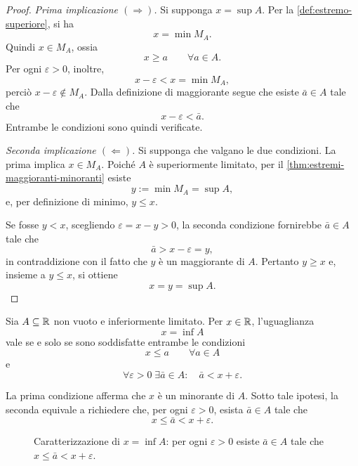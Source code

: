 \begin{proof}
\emph{Prima implicazione \((\Rightarrow)\).}
Si supponga \(x=\sup A\). Per la
\cref{def:estremo-superiore}, si ha
\[
  x=\min M_A.
\]
Quindi \(x\in M_A\), ossia
\[
  x\ge a\qquad\forall a\in A.
\]
Per ogni \(\varepsilon>0\), inoltre,
\[
  x-\varepsilon<x=\min M_A,
\]
perciò \(x-\varepsilon\notin M_A\). Dalla definizione di maggiorante
segue che esiste \(\bar a\in A\) tale che
\[
  x-\varepsilon<\bar a.
\]
Entrambe le condizioni sono quindi verificate.

\emph{Seconda implicazione \((\Leftarrow)\).}
Si supponga che valgano le due condizioni. La prima implica
\(x\in M_A\). Poiché \(A\) è superiormente limitato,
per il \cref{thm:estremi-maggioranti-minoranti} esiste
\[
  y:=\min M_A=\sup A,
\]
e, per definizione di minimo, \(y\le x\).

Se fosse \(y<x\), scegliendo \(\varepsilon=x-y>0\),
la seconda condizione fornirebbe \(\bar a\in A\) tale che
\[
  \bar a>x-\varepsilon=y,
\]
in contraddizione con il fatto che \(y\) è un maggiorante di
\(A\). Pertanto \(y\ge x\) e, insieme a \(y\le x\), si ottiene
\[
  x=y=\sup A.
\]
\end{proof}

\begin{theorem}
\label{thm:caratterizzazione-inf}
Sia \(A\subseteq\mathbb{R}\) non vuoto e inferiormente limitato.
Per \(x\in\mathbb{R}\), l'uguaglianza
\[
  x=\inf A
\]
vale se e solo se sono soddisfatte entrambe le condizioni
\[
  x\le a\qquad\forall a\in A
\]
e
\[
  \forall\varepsilon>0\;\exists\bar a\in A:
  \quad\bar a<x+\varepsilon.
\]
\end{theorem}

La prima condizione afferma che \(x\) è un minorante di \(A\).
Sotto tale ipotesi, la seconda equivale a richiedere che,
per ogni \(\varepsilon>0\), esista \(\bar a\in A\) tale che
\[
  x\le\bar a<x+\varepsilon.
\]

\begin{figure}[htbp]
  \centering
  
  \caption{Caratterizzazione di \(x=\inf A\): per ogni
  \(\varepsilon>0\) esiste \(\bar a\in A\) tale che
  \(x\le\bar a<x+\varepsilon\).}
  \label{fig:caratterizzazione-inf}
\end{figure}

